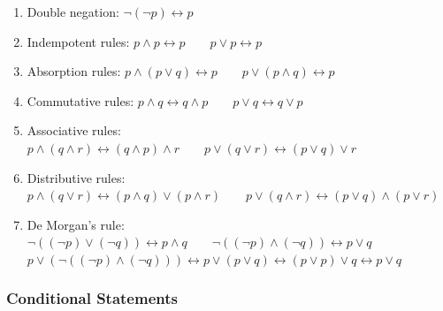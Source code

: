 \documentclass[9pt, letterpaper, oneside]{article}
\begin{document}
\begin{enumerate}
	\item Double negation: $\neg (\neg p) \leftrightarrow p$
	\item Indempotent rules: $p \wedge p \leftrightarrow p \qquad p \vee p \leftrightarrow p$
	\item Absorption rules: $p \wedge (p \vee q) \leftrightarrow p \qquad p \vee (p \wedge q) \leftrightarrow p$
	\item Commutative rules: $p \wedge q \leftrightarrow q \wedge p \qquad p \vee q \leftrightarrow q \vee p $
	\item Associative rules: $p \wedge (q \wedge r) \leftrightarrow (q \wedge p) \wedge r \qquad p \vee (q \vee r)\leftrightarrow (p \vee q) \vee r$
	\item Distributive rules: $p \wedge (q \vee r) \leftrightarrow (p \wedge q) \vee (p \wedge r) \qquad p \vee (q \wedge r) \leftrightarrow (p \vee q) \wedge (p \vee r)$
	\item De Morgan's rule: $\neg((\neg p) \vee (\neg q)) \leftrightarrow p \wedge q \qquad \neg((\neg p) \wedge (\neg q)) \leftrightarrow p \vee q$\\
	$p \vee (\neg ((\neg p) \wedge (\neg q))) \leftrightarrow  p \vee (p \vee q) \leftrightarrow (p \vee p) \vee q \leftrightarrow p \vee q$
\end{enumerate}


\subsubsection{Conditional Statements}
\end{document}
